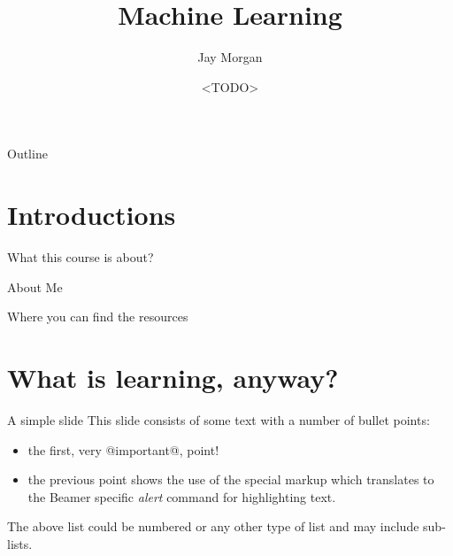 \documentclass[bigger]{beamer}
\author{Jay Morgan}
\date{<TODO>}
\title{Machine Learning}
\begin{document}
\maketitle
\begin{frame}{Outline}
\tableofcontents
\end{frame}

\section{Introductions}
\label{sec:org2519ced}

\begin{frame}[label={sec:orgc7d1904}]{What this course is about?}
\end{frame}

\begin{frame}[label={sec:org487c203}]{About Me}
\end{frame}

\begin{frame}[label={sec:org44e9bd0}]{Where you can find the resources}
\end{frame}

\section{What is learning, anyway?}
\label{sec:org34978bc}
\begin{frame}[label={sec:org83f60ea}]{A simple slide}
This slide consists of some text with a number of bullet points:

\begin{itemize}
\item the first, very @important@, point!
\item the previous point shows the use of the special markup which
translates to the Beamer specific \emph{alert} command for highlighting
text.
\end{itemize}


The above list could be numbered or any other type of list and may
include sub-lists.
\end{frame}
\end{document}
